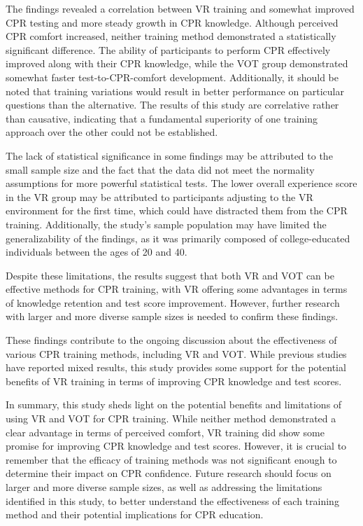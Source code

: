 \documentclass[manuscript]{./Models/acmart}
\begin{document}
The findings revealed a correlation between VR training and somewhat improved CPR testing and more steady growth in CPR knowledge. Although perceived CPR comfort increased, neither training method demonstrated a statistically significant difference. The ability of participants to perform CPR effectively improved along with their CPR knowledge, while the VOT group demonstrated somewhat faster test-to-CPR-comfort development. Additionally, it should be noted that training variations would result in better performance on particular questions than the alternative. The results of this study are correlative rather than causative, indicating that a fundamental superiority of one training approach over the other could not be established.

The lack of statistical significance in some findings may be attributed to the small sample size and the fact that the data did not meet the normality assumptions for more powerful statistical tests. The lower overall experience score in the VR group may be attributed to participants adjusting to the VR environment for the first time, which could have distracted them from the CPR training. Additionally, the study's sample population may have limited the generalizability of the findings, as it was primarily composed of college-educated individuals between the ages of 20 and 40.

Despite these limitations, the results suggest that both VR and VOT can be effective methods for CPR training, with VR offering some advantages in terms of knowledge retention and test score improvement. However, further research with larger and more diverse sample sizes is needed to confirm these findings.

These findings contribute to the ongoing discussion about the effectiveness of various CPR training methods, including VR and VOT. While previous studies have reported mixed results, this study provides some support for the potential benefits of VR training in terms of improving CPR knowledge and test scores.

In summary, this study sheds light on the potential benefits and limitations of using VR and VOT for CPR training. While neither method demonstrated a clear advantage in terms of perceived comfort, VR training did show some promise for improving CPR knowledge and test scores. However, it is crucial to remember that the efficacy of training methods was not significant enough to determine their impact on CPR confidence. Future research should focus on larger and more diverse sample sizes, as well as addressing the limitations identified in this study, to better understand the effectiveness of each training method and their potential implications for CPR education.
\end{document}
